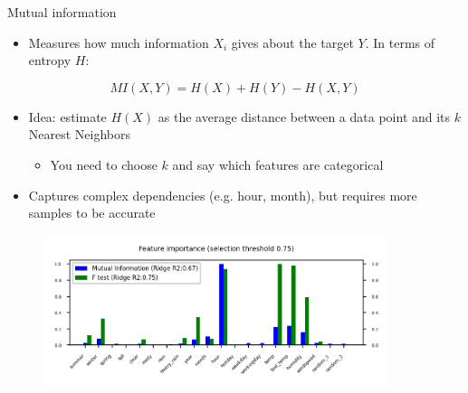 \begin{frame}[allowframebreaks]{Mutual information}
\begin{itemize}
    \item Measures how much information $X_i$ gives about the target $Y$. In terms of entropy $H$:
\end{itemize}

\[
MI(X, Y) = H(X) + H(Y) - H(X, Y)
\]

\begin{itemize}
    \item Idea: estimate $H(X)$ as the average distance between a data point and its $k$ Nearest Neighbors
    \begin{itemize}
        \item You need to choose $k$ and say which features are categorical
    \end{itemize}
    \item Captures complex dependencies (e.g. hour, month), but requires more samples to be accurate
\end{itemize}

\begin{figure}
    \centering
    \includegraphics[width=0.9\textwidth,keepaspectratio]{images/pre-processing/mutual-information.png}
\end{figure}
\end{frame}



